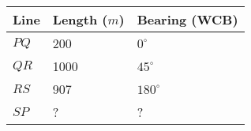 		\begin{table}[h]
	\centering
\begin{tabular}{|l|l|l|}
	\hline
	 Line & Length ($m$)   &  Bearing (WCB)  \\

	\hline
	$PQ$ & 200 & $0^{\circ}$   \\
	\hline
	$QR$ & 1000  &$45^{\circ}$  \\
	\hline
	$RS$ & 907 & $180^{\circ}$  \\
	\hline
	 $SP$  & ?  & ?  \\
	\hline
	



\end{tabular} 
\end{table}
